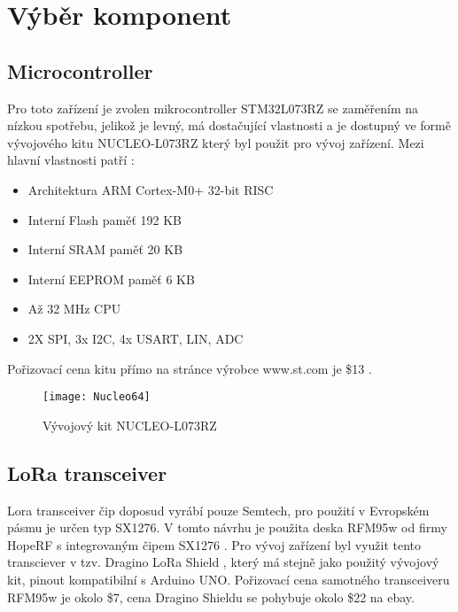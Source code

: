 

\section{Výběr komponent}
\subsection{Microcontroller}
Pro toto zařízení je zvolen mikrocontroller STM32L073RZ se zaměřením na nízkou spotřebu, jelikož je levný, má dostačující vlastnosti a je dostupný ve formě vývojového kitu NUCLEO-L073RZ který byl použit pro  vývoj zařízení. Mezi hlavní vlastnosti patří \cite{nucleoST}:
\begin{itemize}    
    \item {Architektura ARM Cortex-M0+ 32-bit RISC}
    \item{Interní Flash paměť 192 KB}
    \item{Interní SRAM paměť 20 KB}
    \item{Interní EEPROM paměť 6 KB}
    \item {Až 32 MHz CPU}
    \item {2X SPI, 3x I2C, 4x USART, LIN, ADC}
\end{itemize}

Pořizovací cena kitu přímo na stránce výrobce www.st.com je \$13 \cite{nucleoST} \cite{nucleoMbed}.
\begin{figure}[!h]
    \centering
    \texttt{[image: Nucleo64]}
    \caption{Vývojový kit NUCLEO-L073RZ \cite{nucleoST}}
    \label{fig:02}
\end{figure}

\subsection{LoRa transceiver}
Lora transceiver čip doposud vyrábí pouze Semtech, pro použití v Evropském pásmu je určen typ SX1276.
V tomto návrhu je použita deska RFM95w od firmy HopeRF s integrovaným čipem SX1276 \cite{RFM95w}.
Pro vývoj zařízení byl využit tento transciever v tzv. Dragino LoRa Shield \cite{draginoWiki}, který má stejně jako použitý vývojový kit, pinout kompatibilní s Arduino UNO. Pořizovací cena samotného transceiveru RFM95w je okolo \$7, cena Dragino Shieldu se pohybuje okolo \$22 na ebay.

